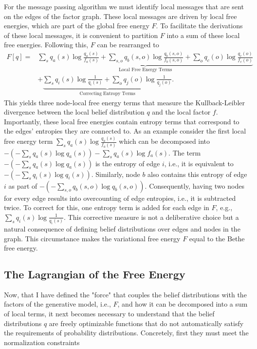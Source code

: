 For the message passing algorithm we must identify local messages that are sent on the edges of the factor graph. These local messages are driven by local free energies, which are part of the global free energy \(F\). To facilitate the derivations of these local messages, it is convenient to partition \(F\) into a sum of these local free energies. Following this, \(F\) can be rearranged to
\begin{equation}
    \begin{split}
        F[q] = & \underbrace{\sum_s q_a(s) \log \frac{q_a(s)}{f_a(s)} + \sum_{s,o} q_b(s,o) \log \frac{q_b(s,o)}{f_b(s,o)} + \sum_o q_c(o) \log \frac{q_c(o)}{f_c(o)}}_{\text{Local Free Energy Terms}} \\
               & + \underbrace{\sum_s q_i(s) \log \frac{1}{q_i(s)} + \sum_o q_j(o) \log \frac{1}{q_j(o)}}_{\text{Correcting Entropy Terms}}.
    \end{split}
\end{equation}
This yields three node-local free energy terms that measure the Kullback-Leibler divergence between the local belief distribution \(q\) and the local factor \(f\). Importantly, these local free energies contain entropy terms that correspond to the edges' entropies they are connected to. As an example consider the first local free energy term \(\sum_s q_a(s) \log \frac{q_a(s)}{f_a(s)}\) which can be decomposed into \(- (-\sum_s q_a(s) \log q_a(s)) - \sum_s q_a(s) \log f_a(s)\). The term \(- (-\sum_s q_a(s) \log q_a(s))\) is the entropy of edge \(i\), i.e., it is equivalent to \(- (-\sum_s q_i(s) \log q_i(s))\). Similarly, node \(b\) also contains this entropy of edge \(i\) as part of \(- (-\sum_{s,o} q_b(s,o) \log q_b(s,o))\). Consequently, having two nodes for every edge results into overcounting of edge entropies, i.e., it is subtracted twice. To correct for this, one entropy term is added for each edge in \(F\), e.g., \(\sum_s q_i(s) \log \frac{1}{q_i(s)}\). This corrective measure is not a deliberative choice but a natural consequence of defining belief distributions over edges and nodes in the graph. This circumstance makes the variational free energy \(F\) equal to the Bethe free energy.

\subsection{The Lagrangian of the Free Energy}

Now, that I have defined the "force" that couples the belief distributions with the factors of the generative model, i.e., \(F\), and how it can be decomposed into a sum of local terms, it next becomes necessary to understand that the belief distributions \(q\) are freely optimizable functions that do not automatically satisfy the requirements of probability distributions. Concretely, first they must meet the normalization constraints

